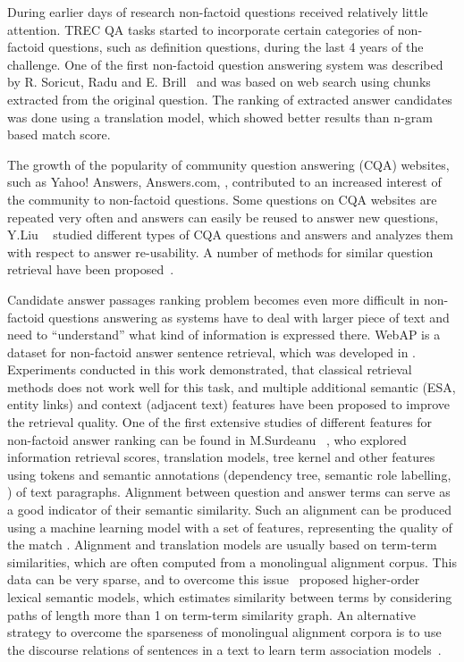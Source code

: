 During earlier days of research non-factoid questions received relatively little attention.
TREC QA tasks started to incorporate certain categories of non-factoid questions, such as definition questions, during the last 4 years of the challenge.
One of the first non-factoid question answering system was described by R. Soricut, Radu and E. Brill~\cite{soricut2006automatic} and was based on web search using chunks extracted from the original question.
The ranking of extracted answer candidates was done using a translation model, which showed better results than n-gram based match score.

The growth of the popularity of community question answering (CQA) websites, such as Yahoo! Answers, Answers.com, \etc, contributed to an increased interest of the community to non-factoid questions.
Some questions on CQA websites are repeated very often and answers can easily be reused to answer new questions, Y.Liu \etal~\cite{Liu:2008:USA:1599081.1599144} studied different types of CQA questions and answers and analyzes them with respect to answer re-usability.
A number of methods for similar question retrieval have been proposed~\cite{bernhard2009combining,Shtok:2012:LPA:2187836.2187939,duan2008searching,Jeon:2005:FSQ:1099554.1099572}.

Candidate answer passages ranking problem becomes even more difficult in non-factoid questions answering as systems have to deal with larger piece of text and need to ``understand'' what kind of information is expressed there.
WebAP is a dataset for non-factoid answer sentence retrieval, which was developed in \cite{yang2016beyond}.
Experiments conducted in this work demonstrated, that classical retrieval methods does not work well for this task, and multiple additional semantic (ESA, entity links) and context (adjacent text) features have been proposed to improve the retrieval quality.
One of the first extensive studies of different features for non-factoid answer ranking can be found in M.Surdeanu \etal~\cite{surdeanu2011learning}, who explored information retrieval scores, translation models, tree kernel and other features using tokens and semantic annotations (dependency tree, semantic role labelling, \etc) of text paragraphs.
Alignment between question and answer terms can serve as a good indicator of their semantic similarity.
Such an alignment can be produced using a machine learning model with a set of features, representing the quality of the match \cite{wang2015faq}.
Alignment and translation models are usually based on term-term similarities, which are often computed from a monolingual alignment corpus.
This data can be very sparse, and to overcome this issue~\cite{fried2015higher} proposed higher-order lexical semantic models, which estimates similarity between terms by considering paths of length more than 1 on term-term similarity graph.
An alternative strategy to overcome the sparseness of monolingual alignment corpora is to use the discourse relations of sentences in a text to learn term association models~\cite{sharp2015spinning}.

